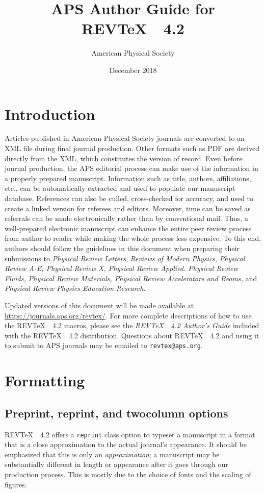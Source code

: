 \documentclass[twocolumn,secnumarabic,amssymb, nobibnotes, aps, prd]{revtex4-2}
\newcommand{\revtex}{REV\TeX\ }
\newcommand{\classoption}[1]{\texttt{#1}}
\begin{document}
\title{APS Author Guide for \revtex~4.2}%

\author{American Physical Society}%
\date{December 2018}%
\maketitle
\tableofcontents

\section{Introduction}
Articles published in American Physical Society journals are converted to 
an XML file during final journal production. Other formats such
as PDF are derived directly from the XML, which constitutes the version of record. 
Even before journal production, the APS editorial process can make use
of the information in a properly prepared manuscript. Information such
as title, authors, affiliations, etc., can be automatically
extracted and used to populate our manuscript database. References can
also be culled, cross-checked for accuracy, and used to create a
linked version for referees and editors. Moreover, time can be saved
as referrals can be made electronically rather than by conventional
mail. Thus, a well-prepared electronic manuscript can enhance the
entire peer review process from author to reader while making the
whole process less expensive. To this end, authors should follow the
guidelines in this document when preparing their submissions to \textit{Physical Review Letters},
 \textit{Reviews of Modern Physics},  \textit{Physical Review A-E, Physical Review X, Physical Review Applied. Physical Review Fluids, Physical Review Materials, Physical Review Accelerators and Beams,} and \textit{Physical Review Physics Education Research}.
 
Updated versions of this document will be made available at  \url{https://journals.aps.org/revtex/}. For more complete
descriptions of how to use the \revtex\ 4.2 macros, please see the
\textit{\revtex~4.2 Author's Guide} included with the \revtex~4.2
distribution. Questions about \revtex\ 4.2 and using it to submit to APS journals may be
emailed to \texttt{revtex@aps.org}.

\section{Formatting}
\subsection{Preprint, reprint, and twocolumn options}
\revtex~4.2 offers a \classoption{reprint} class option to typeset a manuscript
in a format that is a close approximation to the actual journal's appearance. It should
be emphasized that this is only an \textit{approximation}; a manuscript may be substantially different
in length or appearance after it goes through our production process. This is mostly due to the choice
of fonts and the scaling of figures.
\end{document}
